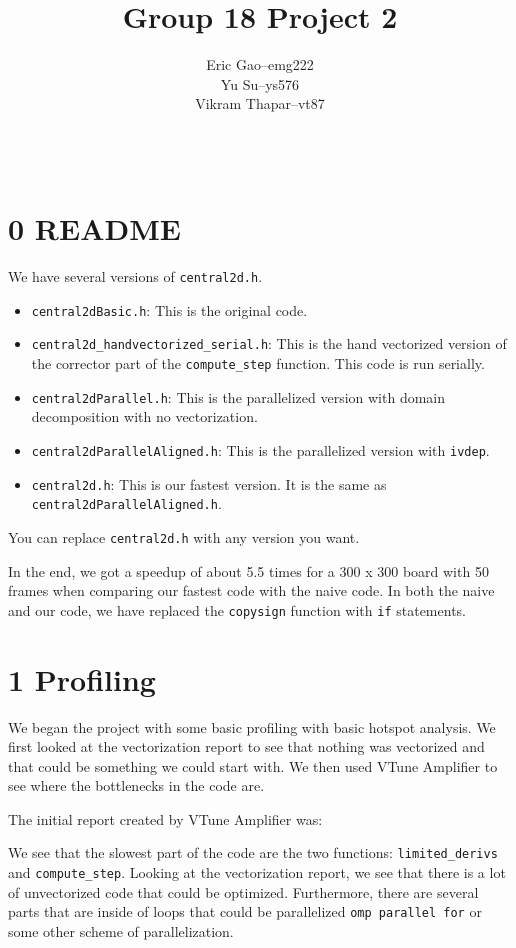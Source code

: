 \documentclass[11pt]{article}
\title{Group 18 Project 2} %
\author{
  \begin{tabular}{l c l}
    Eric Gao & -- & emg222\\
    Yu Su    & -- & ys576\\
    Vikram Thapar & -- & vt87
  \end{tabular}\\
  \rule{\linewidth}{0.4pt}
}
\date{}
\begin{document}
    \thispagestyle{empty}
    \maketitle

    \section{0 README}
        We have several versions of \texttt{central2d.h}.
        \begin{itemize}
            \item \texttt{central2dBasic.h}: This is the original code.
            \item \texttt{central2d\_handvectorized\_serial.h}: This is the hand vectorized version of the corrector part of the \texttt{compute\_step} function. This code is run serially.
            \item \texttt{central2dParallel.h}: This is the parallelized version with domain decomposition with no vectorization.
            \item \texttt{central2dParallelAligned.h}: This is the parallelized version with \texttt{ivdep}.
            \item \texttt{central2d.h}: This is our fastest version. It is the same as \texttt{central2dParallelAligned.h}.
        \end{itemize}

        You can replace \texttt{central2d.h} with any version you want.

        In the end, we got a speedup of about 5.5 times for a 300 x 300 board with 50 frames when comparing our fastest code with the naive code. In both the naive and our code, we have replaced the \texttt{copysign} function with \texttt{if} statements.

    \section{1 Profiling}
        We began the project with some basic profiling with basic hotspot analysis. We first looked at the vectorization report to see that nothing was vectorized and that could be something we could start with. We then used VTune Amplifier to see where the bottlenecks in the code are.

        The initial report created by VTune Amplifier was:
        

        We see that the slowest part of the code are the two functions: \texttt{limited\_derivs} and \texttt{compute\_step}. Looking at the vectorization report, we see that there is a lot of unvectorized code that could be optimized. Furthermore, there are several parts that are inside of loops that could be parallelized \texttt{omp parallel for} or some other scheme of parallelization.
\end{document}
